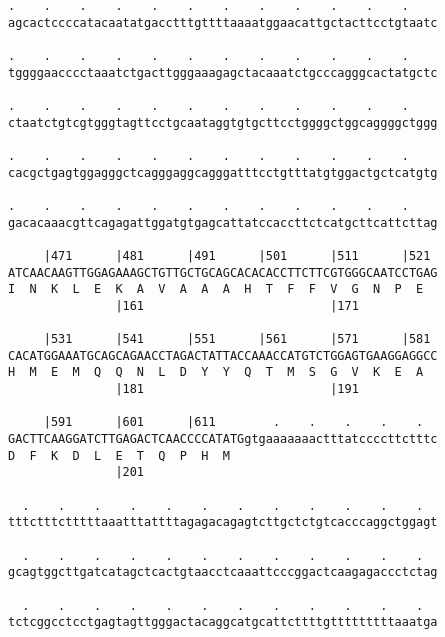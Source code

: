 \documentclass{article}
\begin{document}
\begin{Verbatim}
.    .    .    .    .    .    .    .    .    .    .    .    
agcactccccatacaatatgacctttgttttaaaatggaacattgctacttcctgtaatc
                                                            
.    .    .    .    .    .    .    .    .    .    .    .    
tggggaacccctaaatctgacttgggaaagagctacaaatctgcccagggcactatgctc
                                                            
.    .    .    .    .    .    .    .    .    .    .    .    
ctaatctgtcgtgggtagttcctgcaataggtgtgcttcctggggctggcaggggctggg
                                                            
.    .    .    .    .    .    .    .    .    .    .    .    
cacgctgagtggagggctcagggaggcagggatttcctgtttatgtggactgctcatgtg
                                                            
.    .    .    .    .    .    .    .    .    .    .    .    
gacacaaacgttcagagattggatgtgagcattatccaccttctcatgcttcattcttag
                                                            
     |471      |481      |491      |501      |511      |521 
ATCAACAAGTTGGAGAAAGCTGTTGCTGCAGCACACACCTTCTTCGTGGGCAATCCTGAG
I  N  K  L  E  K  A  V  A  A  A  H  T  F  F  V  G  N  P  E  
               |161                          |171           
  
     |531      |541      |551      |561      |571      |581 
CACATGGAAATGCAGCAGAACCTAGACTATTACCAAACCATGTCTGGAGTGAAGGAGGCC
H  M  E  M  Q  Q  N  L  D  Y  Y  Q  T  M  S  G  V  K  E  A  
               |181                          |191           
  
     |591      |601      |611        .    .    .    .    .  
GACTTCAAGGATCTTGAGACTCAACCCCATATGgtgaaaaaaactttatccccttctttc
D  F  K  D  L  E  T  Q  P  H  M                             
               |201                                         
  
  .    .    .    .    .    .    .    .    .    .    .    .  
tttctttctttttaaatttattttagagacagagtcttgctctgtcacccaggctggagt
                                                            
  .    .    .    .    .    .    .    .    .    .    .    .  
gcagtggcttgatcatagctcactgtaacctcaaattcccggactcaagagaccctctag
                                                            
  .    .    .    .    .    .    .    .    .    .    .    .  
tctcggcctcctgagtagttgggactacaggcatgcattcttttgtttttttttaaatga
                                                            

\end{Verbatim}
\end{document}
